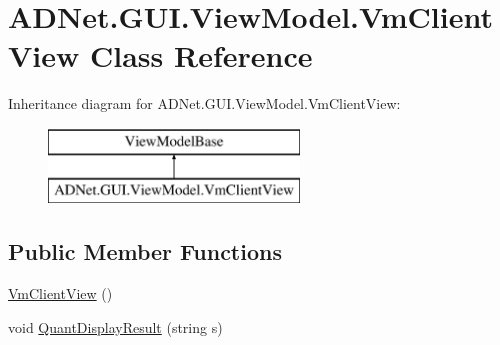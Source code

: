 \hypertarget{class_a_d_net_1_1_g_u_i_1_1_view_model_1_1_vm_client_view}{}\section{A\+D\+Net.\+G\+U\+I.\+View\+Model.\+Vm\+Client\+View Class Reference}
\label{class_a_d_net_1_1_g_u_i_1_1_view_model_1_1_vm_client_view}
Inheritance diagram for A\+D\+Net.\+G\+U\+I.\+View\+Model.\+Vm\+Client\+View\+:\begin{figure}[H]
\begin{center}
\leavevmode
\includegraphics[height=2.000000cm]{class_a_d_net_1_1_g_u_i_1_1_view_model_1_1_vm_client_view}
\end{center}
\end{figure}
\subsection*{Public Member Functions}
\begin{DoxyCompactItemize}
\item 
\hyperlink{class_a_d_net_1_1_g_u_i_1_1_view_model_1_1_vm_client_view_a5a02b67a087b254323e7990691467721}{Vm\+Client\+View} ()
\item 
void \hyperlink{class_a_d_net_1_1_g_u_i_1_1_view_model_1_1_vm_client_view_ae32597da68db29109f84b9d11e65ddd1}{Quant\+Display\+Result} (string s)
\end{DoxyCompactItemize}
